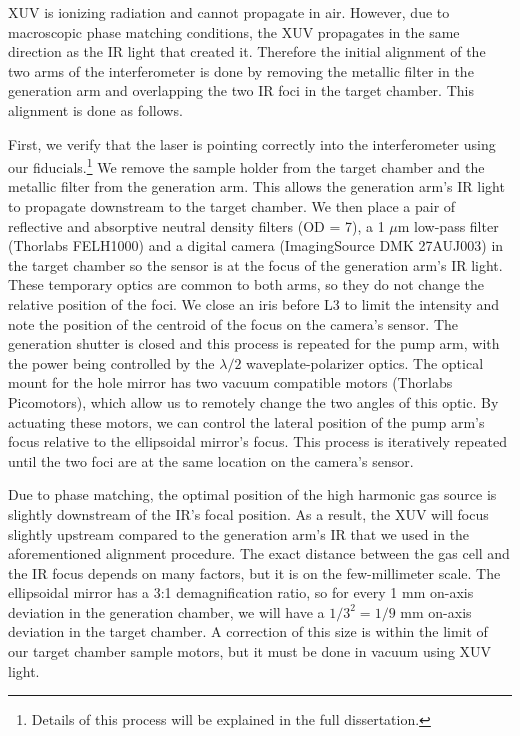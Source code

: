 XUV is ionizing radiation and cannot propagate in air. However, due to macroscopic phase matching conditions, the XUV propagates in the same direction as the IR light that created it. Therefore the initial alignment of the two arms of the interferometer is done by removing the metallic filter in the generation arm and overlapping the two IR foci in the target chamber. This alignment is done as follows.

First, we verify that the laser is pointing correctly into the interferometer using our fiducials.\footnote{Details of this process will be explained in the full dissertation.} We remove the sample holder from the target chamber and the metallic filter from the generation arm. This allows the generation arm's IR light to propagate downstream to the target chamber. We then place a pair of reflective and absorptive neutral density filters (OD = 7), a 1 $\mu$m low-pass filter (Thorlabs FELH1000) and a digital camera (ImagingSource DMK 27AUJ003) in the target chamber so the sensor is at the focus of the generation arm's IR light. These temporary optics are common to both arms, so they do not change the relative position of the foci. We close an iris before L3 to limit the intensity and note the position of the centroid of the focus on the camera's sensor. The generation shutter is closed and this process is repeated for the pump arm, with the power being controlled by the $\lambda /2$ waveplate-polarizer optics. The optical mount for the hole mirror has two vacuum compatible motors (Thorlabs Picomotors), which allow us to remotely change the two angles of this optic. By actuating these motors, we can control the lateral position of the pump arm's focus relative to the ellipsoidal mirror's focus. This process is iteratively repeated until the two foci are at the same location on the camera's sensor.

Due to phase matching, the optimal position of the high harmonic gas source is slightly downstream of the IR's focal position. As a result, the XUV will focus slightly upstream compared to the generation arm's IR that we used in the aforementioned alignment procedure. The exact distance between the gas cell and the IR focus depends on many factors, but it is on the few-millimeter scale. The ellipsoidal mirror has a 3:1 demagnification ratio, so for every 1 mm on-axis deviation in the generation chamber, we will have a $1/3^2 = 1/9$ mm on-axis deviation in the target chamber. A correction of this size is within the limit of our target chamber sample motors, but it must be done in vacuum using XUV light.


